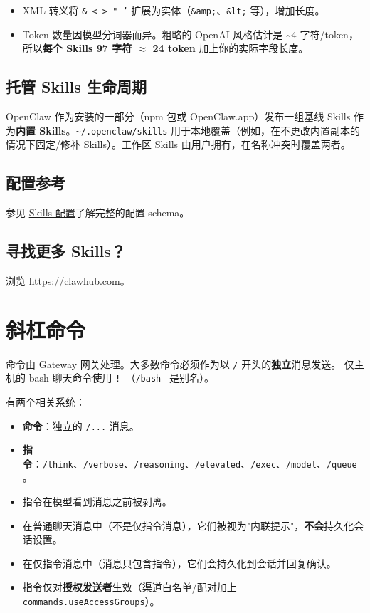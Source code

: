 \begin{itemize}
  \item XML 转义将 \texttt{\& < > " '} 扩展为实体（\texttt{\&amp;}、\texttt{\&lt;} 等），增加长度。
  \item Token 数量因模型分词器而异。粗略的 OpenAI 风格估计是 \textasciitilde{}4 字符/token，所以\textbf{每个 Skills 97 字符 $\approx$ 24 token} 加上你的实际字段长度。
\end{itemize}


\subsection{托管 Skills 生命周期}


OpenClaw 作为安装的一部分（npm 包或 OpenClaw.app）发布一组基线 Skills 作为\textbf{内置 Skills}。\texttt{\textasciitilde{}/.openclaw/skills} 用于本地覆盖（例如，在不更改内置副本的情况下固定/修补 Skills）。工作区 Skills 由用户拥有，在名称冲突时覆盖两者。

\subsection{配置参考}


参见 \href{/tools/skills-config}{Skills 配置}了解完整的配置 schema。

\subsection{寻找更多 Skills？}


浏览 https://clawhub.com。

\hrulefill



\clearpage

\section{斜杠命令}


命令由 Gateway 网关处理。大多数命令必须作为以 \texttt{/} 开头的\textbf{独立}消息发送。
仅主机的 bash 聊天命令使用 \texttt{! }（\texttt{/bash } 是别名）。

有两个相关系统：

\begin{itemize}
  \item \textbf{命令}：独立的 \texttt{/...} 消息。
  \item \textbf{指令}：\texttt{/think}、\texttt{/verbose}、\texttt{/reasoning}、\texttt{/elevated}、\texttt{/exec}、\texttt{/model}、\texttt{/queue}。
  \item 指令在模型看到消息之前被剥离。
  \item 在普通聊天消息中（不是仅指令消息），它们被视为"内联提示"，\textbf{不会}持久化会话设置。
  \item 在仅指令消息中（消息只包含指令），它们会持久化到会话并回复确认。
  \item 指令仅对\textbf{授权发送者}生效（渠道白名单/配对加上 \texttt{commands.useAccessGroups}）。
\end{itemize}


